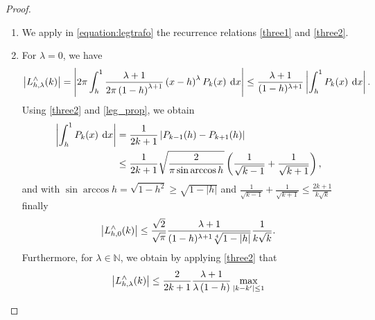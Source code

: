 \documentclass[11pt,a4paper,twoside,bibtotoc]{scrartcl}
\theoremstyle{plain}
\theoremstyle{definition}
\theoremstyle{remark}
\newcommand{\N}{\ensuremath{\mathbb{N}}}
\newcommand{\fun}[2]{\ensuremath{#1{\hspace{-0.4ex}}\left(#2\right)}}
\newcommand{\dx}{\text{\rm{d}}}
\numberwithin{equation}{section}
\numberwithin{table}{section}
\numberwithin{figure}{section}
\begin{document}
\begin{proof}
  ${}^{}$\\[-2ex]
  \begin{enumerate}
  \item We apply in \eqref{equation:legtrafo} the recurrence relations \eqref{three1} and \eqref{three2}.
  \item For $\lambda=0$, we have
    \begin{equation*}
      \left|\fun{L_{h,\lambda}^{\wedge}}{k}\right| 
      = \left| 2\pi \int_{h}^1 \frac{\lambda+1}{2\pi\left(1-h\right)^{\lambda+1}}
        \left(x-h\right)^{\lambda} \fun{P_{k}}{x} \: \dx x\right| 
      \le \frac{\lambda+1}{(1-h)^{\lambda+1}}\left|\int_{h}^1 \fun{P_{k}}{x} \: \dx x\right|.
    \end{equation*}
    Using \eqref{three2} and \eqref{leg_prop}, we obtain
    \begin{align*}
      \left|\int_{h}^1 \fun{P_{k}}{x} \: \dx x\right|
      & = \frac{1}{2k+1}
          \left|\fun{P_{k-1}}{h} - \fun{P_{k+1}}{h}\right|\\
      & \le \frac{1}{2k+1} \sqrt{\frac{2}{\pi \sin\arccos h}} \left(\frac{1}{\sqrt{k-1}} + \frac{1}{\sqrt{k+1}}\right),
    \end{align*}
    and with $\sin\arccos h = \sqrt{1-h^2} \ge \sqrt{1-|h|}$ and
    $\frac{1}{\sqrt{k-1}} + \frac{1}{\sqrt{k+1}} \le
    \frac{2k+1}{k\sqrt{k}}$ finally
    \begin{equation}
      \label{SmallLambda}
      \left|\fun{L_{h,0}^{\wedge}}{k}\right| \le 
      \frac{\sqrt{2}}{\sqrt{\pi}}\frac{\lambda+1}{(1-h)^{\lambda+1}\sqrt[4]{1-|h|}}
      \frac{1}{k\sqrt{k}}.
    \end{equation}
    Furthermore, for $\lambda \in \N$, we obtain by applying \eqref{three2} that
    \begin{equation*}
      \left|\fun{L_{h,\lambda}^{\wedge}}{k}\right| 
      \le \frac{2}{2k+1} \frac{\lambda+1}{\lambda\left(1-h\right)}
      \max\limits_{|k-k'|\le 1}

\end{equation*}
\end{enumerate}
\end{proof}
\end{document}
